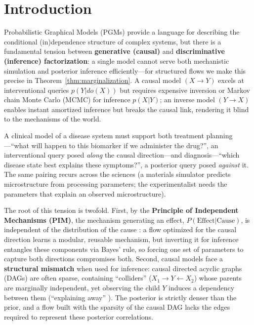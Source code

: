 \section{Introduction}
\label{sec:intro}

Probabilistic Graphical Models (PGMs) provide a language for describing the conditional (in)dependence structure of complex systems, but there is a fundamental tension between \textbf{generative (causal)} and \textbf{discriminative (inference) factorization}: a single model cannot serve both mechanistic simulation and posterior inference efficiently---for structured flows we make this precise in Theorem~\ref{thm:marginalization}. A causal model $(X \to Y)$ excels at interventional queries $p(Y | do(X))$ but requires expensive inversion or Markov chain Monte Carlo (MCMC) for inference $p(X | Y)$; an inverse model $(Y \to X)$ enables instant amortized inference but breaks the causal link, rendering it blind to the mechanisms of the world.

A clinical model of a disease system must support both treatment planning---``what will happen to this biomarker if we administer the drug?'', an interventional query posed \emph{along} the causal direction---and diagnosis---``which disease state best explains these symptoms?'', a posterior query posed \emph{against} it. The same pairing recurs across the sciences (a materials simulator predicts microstructure from processing parameters; the experimentalist needs the parameters that explain an observed microstructure).

The root of this tension is twofold. First, by the \textbf{Principle of Independent Mechanisms (PIM)}, the mechanism generating an effect, $P(\text{Effect}|\text{Cause})$, is independent of the distribution of the cause \citep{Peters2017}: a flow optimized for the causal direction learns a modular, reusable mechanism, but inverting it for inference entangles these components via Bayes' rule, so forcing one set of parameters to capture both directions compromises both. Second, causal models face a \textbf{structural mismatch} when used for inference: causal directed acyclic graphs (DAGs) are often sparse, containing ``colliders'' ($X_1 \to Y \leftarrow X_2$) whose parents are marginally independent, yet observing the child $Y$ induces a dependency between them (``explaining away'' \citep{Koller2009}). The posterior is strictly denser than the prior, and a flow built with the sparsity of the causal DAG lacks the edges required to represent these posterior correlations.

